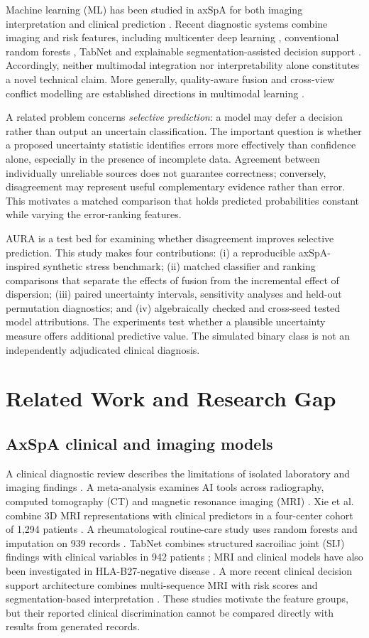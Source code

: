 \documentclass[conference]{IEEEtran}
\begin{document}
Machine learning (ML) has been studied in axSpA for both imaging interpretation and clinical prediction \cite{adams,meta}. Recent diagnostic systems combine imaging and risk features, including multicenter deep learning \cite{xie}, conventional random forests \cite{rf}, TabNet \cite{tabnet} and explainable segmentation-assisted decision support \cite{cdss}. Accordingly, neither multimodal integration nor interpretability alone constitutes a novel technical claim. More generally, quality-aware fusion and cross-view conflict modelling are established directions in multimodal learning \cite{tmc,qamoe,aemrl}.

A related problem concerns \emph{selective prediction}: a model may defer a decision rather than output an uncertain classification. The important question is whether a proposed uncertainty statistic identifies errors more effectively than confidence alone, especially in the presence of incomplete data. Agreement between individually unreliable sources does not guarantee correctness; conversely, disagreement may represent useful complementary evidence rather than error. This motivates a matched comparison that holds predicted probabilities constant while varying the error-ranking features.

AURA is a test bed for examining whether disagreement improves selective prediction. This study makes four contributions: (i) a reproducible axSpA-inspired synthetic stress benchmark; (ii) matched classifier and ranking comparisons that separate the effects of fusion from the incremental effect of dispersion; (iii) paired uncertainty intervals, sensitivity analyses and held-out permutation diagnostics; and (iv) algebraically checked and cross-seed tested model attributions. The experiments test whether a plausible uncertainty measure offers additional predictive value. The simulated binary class is not an independently adjudicated clinical diagnosis.
\section{Related Work and Research Gap}
\subsection{AxSpA clinical and imaging models}
A clinical diagnostic review describes the limitations of isolated laboratory and imaging findings \cite{clinical}. A meta-analysis examines AI tools across radiography, computed tomography (CT) and magnetic resonance imaging (MRI) \cite{meta}. Xie et al. combine 3D MRI representations with clinical predictors in a four-center cohort of 1,294 patients \cite{xie}. A rheumatological routine-care study uses random forests and imputation on 939 records \cite{rf}. TabNet combines structured sacroiliac joint (SIJ) findings with clinical variables in 942 patients \cite{tabnet}; MRI and clinical models have also been investigated in HLA-B27-negative disease \cite{negative}. A more recent clinical decision support architecture combines multi-sequence MRI with risk scores and segmentation-based interpretation \cite{cdss}. These studies motivate the feature groups, but their reported clinical discrimination cannot be compared directly with results from generated records.
\end{document}
